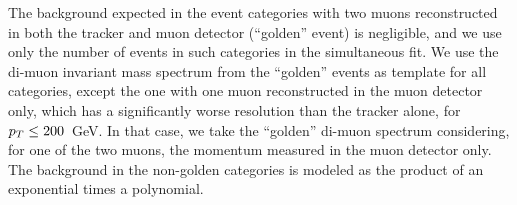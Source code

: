 The background expected in the event categories with two muons 
reconstructed in both the tracker and muon detector (``golden'' event) 
is negligible, and we use only the number of events in such categories in the simultaneous fit.
We use the di-muon invariant mass spectrum from the ``golden'' events as 
template for all categories, except the one with one muon reconstructed in the muon detector only,
which has a significantly worse resolution than the tracker alone,
for  $p_{T}\leq 200$~GeV. In that case, we take the ``golden'' di-muon 
spectrum considering, for one of the two muons, the momentum measured in the 
muon detector only.
The background in the non-golden categories is modeled as the product
of an exponential times a polynomial.




